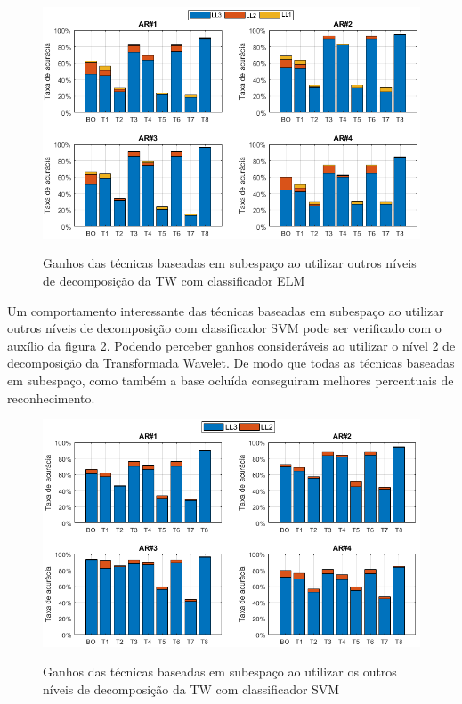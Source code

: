 \begin{figure}[H]
\centering
\caption{Ganhos das técnicas baseadas em subespaço ao utilizar outros níveis de decomposição da TW com classificador ELM}
\includegraphics[scale=0.60]{imgs4/ganhos/ganhos_subespaco_ELM_niveis}
\label{fig:ganhos_com_ELM_subespaco_AR}
\end{figure}




Um comportamento interessante das técnicas baseadas em subespaço ao utilizar outros níveis de decomposição com classificador SVM pode ser verificado com o auxílio da figura \ref{fig:ganhos_com_SVM_subespaco_AR}. Podendo perceber ganhos consideráveis ao utilizar o nível 2 de decomposição da Transformada Wavelet. De modo que todas as técnicas baseadas em subespaço, como também a base ocluída conseguiram melhores percentuais de reconhecimento.
\begin{figure}[H]
\centering
\caption{Ganhos das técnicas baseadas em subespaço ao utilizar os outros níveis de decomposição da TW com classificador SVM}
\includegraphics[scale=0.60]{imgs4/ganhos/ganhos_subespaco_SVM_niveis}
\label{fig:ganhos_com_SVM_subespaco_AR}
\end{figure}


